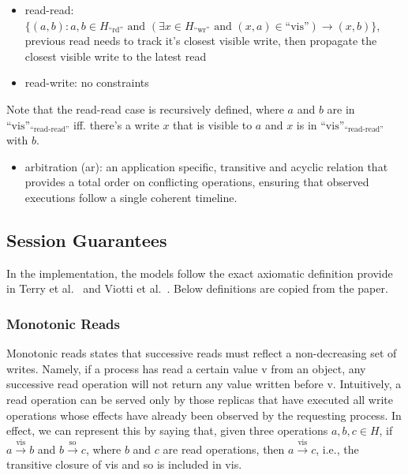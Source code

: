 \begin{itemize}
\item read-read: $\{(a, b) : a, b \in H_\text{``rd''} \text{ and } (\exists x \in H_\text{``wr''} \text{ and } (x, a) \in \text{``vis''}) \rightarrow (x, b)\}$,
  previous read needs to track it's closest visible write, then propagate the
  closest visible write to the latest read

\item read-write: no constraints
\end{itemize}

Note that the read-read case is recursively defined, where $a$ and $b$ are in $\text{``vis''}_\text{``read-read''}$ iff.
there's a write $x$ that is visible to $a$ and $x$ is in $\text{``vis''}_\text{``read-read''}$ with $b$.

\begin{itemize}
\item arbitration (ar): an application specific, transitive and acyclic relation that
  provides a total order on conflicting operations, ensuring that observed
  executions follow a single coherent timeline.
\end{itemize}

\subsection{Session Guarantees}

In the implementation, the models follow the exact axiomatic definition provide
in Terry et al.~\cite{terry1994session} and Viotti et al.~\cite{viotti2016consistency}.
Below definitions are copied from the paper.

\subsubsection{Monotonic Reads}

Monotonic reads states that successive reads must reflect a non-decreasing set
of writes. Namely, if a process has read a certain value v from an object, any
successive read operation will not return any value written before v.
Intuitively, a read operation can be served only by those replicas that have
executed all write operations whose effects have already been observed by the
requesting process. In effect, we can represent this by saying that, given three
operations $a, b, c \in H$, if $a \xrightarrow{\text{vis}} b$ and
$b \xrightarrow{\text{so}} c$, where $b$ and $c$ are read operations, then
$a \xrightarrow{\text{vis}} c$, i.e., the transitive closure of vis and so is included
in vis.

